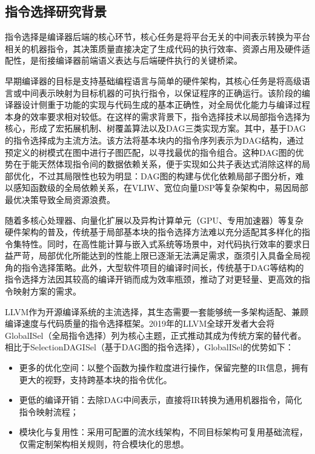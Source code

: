 \subsection{指令选择研究背景}
指令选择是编译器后端的核心环节，核心任务是将平台无关的中间表示转换为平台相关的机器指令，其决策质量直接决定了生成代码的执行效率、资源占用及硬件适配性\cite{bezbaruah2024comparative}，是衔接编译器前端语义表达与后端硬件执行的关键桥梁。

\par

早期编译器的目标是支持基础编程语言与简单的硬件架构，其核心任务是将高级语言或中间表示映射为目标机器的可执行指令，以保证程序的正确运行。该阶段的编译器设计侧重于功能的实现与代码生成的基本正确性，对全局优化能力与编译过程本身的效率要求相对较低。在这样的需求背景下，指令选择技术以局部指令选择为核心，形成了宏拓展机制、树覆盖算法\cite{hjort2016tree}以及DAG\cite{smotherman1991efficient}三类实现方案。其中，基于DAG的指令选择成为主流方法。该方法将基本块内的指令序列表示为DAG结构，通过预定义的树模式在图中进行子图匹配，以寻找最优的指令组合。这种DAG图的优势在于能天然体现指令间的数据依赖关系，便于实现如公共子表达式消除这样的局部优化，不过其局限性也较为明显：DAG图的构建与优化依赖局部子图分析，难以感知函数级的全局依赖关系，在VLIW、宽位向量DSP等复杂架构中，易因局部最优决策导致全局资源浪费。

\par

随着多核心处理器、向量化扩展以及异构计算单元（GPU、专用加速器）等复杂硬件架构的普及，传统基于局部基本块的指令选择方法难以充分适配其多样化的指令集特性。同时，在高性能计算与嵌入式系统等场景中，对代码执行效率的要求日益严苛，局部优化所能达到的性能上限已逐渐无法满足需求，亟须引入具备全局视角的指令选择策略。此外，大型软件项目的编译时间长，传统基于DAG等结构的指令选择方法因其较高的编译开销而成为效率瓶颈，推动了对更轻量、更高效的指令映射方案的需求。

\par

LLVM作为开源编译系统的主流选择，其生态需要一套能够统一多架构适配、兼顾编译速度与代码质量的指令选择框架。2019年的LLVM全球开发者大会将GlobalISel（全局指令选择）列为核心主题，正式推动其成为传统方案的替代者。相比于SelectionDAGISel（基于DAG图的指令选择），GlobalISel的优势如下：

\begin{itemize}
	\item
	更多的优化空间：以整个函数为操作粒度进行操作，保留完整的IR信息，拥有更大的视野，支持跨基本块的指令优化。
	
	\item
	更低的编译开销：去除DAG中间表示，直接将IR转换为通用机器指令，简化指令映射流程；
	
	\item 
	模块化与复用性：采用可配置的流水线架构，不同目标架构可复用基础流程，仅需定制架构相关规则，符合模块化的思想。
	
\end{itemize}


